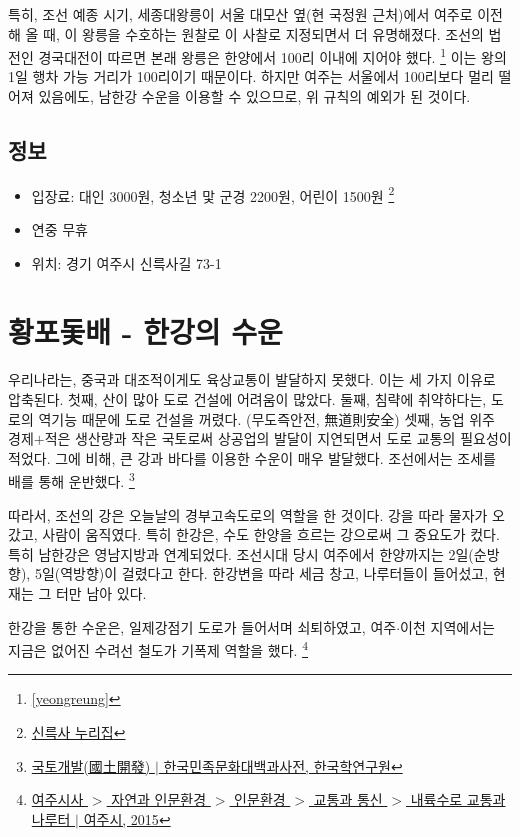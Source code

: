 특히, 조선 예종 시기, 세종대왕릉이 서울 대모산 옆(현 국정원 근처)에서 여주로 이전해 올 때,
이 왕릉을 수호하는 원찰로 이 사찰로 지정되면서 더 유명해졌다.
조선의 법전인 경국대전이 따르면 본래 왕릉은 한양에서 100리 이내에 지어야 했다. 
\footnote{\ref{yeongreung}}
이는 왕의 1일 행차 가능 거리가 100리이기 때문이다.
하지만 여주는 서울에서 100리보다 멀리 떨어져 있음에도, 남한강 수운을 이용할 수 있으므로,
위 규칙의 예외가 된 것이다.

\subsection{정보}
\begin{itemize}
    \item 입장료: 대인 3000원, 청소년 맟 군경 2200원, 어린이 1500원 
    \footnote{\href{http://www.silleuksa.org/}{신륵사 누리집}}
    \item 연중 무휴
    \item 위치: 경기 여주시 신륵사길 73-1
\end{itemize}

\section{황포돛배 - 한강의 수운}

우리나라는, 중국과 대조적이게도 육상교통이 발달하지 못했다. 이는 세 가지 이유로 압축된다.
첫째, 산이 많아 도로 건설에 어려움이 많았다. 
둘째, 침략에 취약하다는, 도로의 역기능 때문에 도로 건설을 꺼렸다. (무도즉안전, 無道則安全)
셋째, 농업 위주 경제$+$적은 생산량과 작은 국토로써 상공업의 발달이 지연되면서 도로 교통의 필요성이 적었다.
그에 비해, 큰 강과 바다를 이용한 수운이 매우 발달했다. 조선에서는 조세를 배를 통해 운반했다. 
\footnote{\href{http://encykorea.aks.ac.kr/Contents/Item/E0006539}{국토개발(國土開發) $|$ 한국민족문화대백과사전, 한국학연구원}}


따라서, 조선의 강은 오늘날의 경부고속도로의 역할을 한 것이다. 강을 따라 물자가 오갔고, 사람이 움직였다.
특히 한강은, 수도 한양을 흐르는 강으로써 그 중요도가 컸다. 특히 남한강은 영남지방과 연계되었다. 
조선시대 당시 여주에서 한양까지는 2일(순방향), 5일(역방향)이 걸렸다고 한다.
한강변을 따라 세금 창고, 나루터들이 들어섰고, 현재는 그 터만 남아 있다.


한강을 통한 수운은, 일제강점기 도로가 들어서며 쇠퇴하였고, 
여주$\cdot$이천 지역에서는 지금은 없어진 수려선 철도가 기폭제 역할을 했다.
\footnote{ \href{https://www.yeoju.go.kr/history/jsp/Theme/Theme.jsp?BC_ID=a0085}{여주시사 $>$ 자연과 인문환경 $>$ 인문환경 $>$ 교통과 통신 $>$ 내륙수로 교통과 나루터 $|$ 여주시, 2015}}

